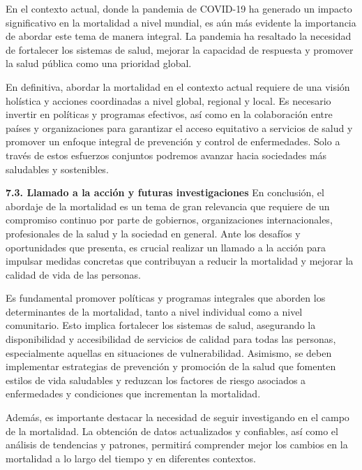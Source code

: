 \documentclass[8pt,a4paper]{beamer}
\begin{document}
{\begin{frame}{}
\begin{block}{}
En el contexto actual, donde la pandemia de COVID-19 ha generado un impacto significativo en la mortalidad a nivel mundial, es aún más evidente la importancia de abordar este tema de manera integral. La pandemia ha resaltado la necesidad de fortalecer los sistemas de salud, mejorar la capacidad de respuesta y promover la salud pública como una prioridad global.

En definitiva, abordar la mortalidad en el contexto actual requiere de una visión holística y acciones coordinadas a nivel global, regional y local. Es necesario invertir en políticas y programas efectivos, así como en la colaboración entre países y organizaciones para garantizar el acceso equitativo a servicios de salud y promover un enfoque integral de prevención y control de enfermedades. Solo a través de estos esfuerzos conjuntos podremos avanzar hacia sociedades más saludables y sostenibles.
\end{block}
\end{frame}

\begin{frame}{}
\begin{block}{\textbf{7.3. Llamado a la acción y futuras investigaciones}}
\setlength{\parskip}{3px}
\justifying
En conclusión, el abordaje de la mortalidad es un tema de gran relevancia que requiere de un compromiso continuo por parte de gobiernos, organizaciones internacionales, profesionales de la salud y la sociedad en general. Ante los desafíos y oportunidades que presenta, es crucial realizar un llamado a la acción para impulsar medidas concretas que contribuyan a reducir la mortalidad y mejorar la calidad de vida de las personas.

Es fundamental promover políticas y programas integrales que aborden los determinantes de la mortalidad, tanto a nivel individual como a nivel comunitario. Esto implica fortalecer los sistemas de salud, asegurando la disponibilidad y accesibilidad de servicios de calidad para todas las personas, especialmente aquellas en situaciones de vulnerabilidad. Asimismo, se deben implementar estrategias de prevención y promoción de la salud que fomenten estilos de vida saludables y reduzcan los factores de riesgo asociados a enfermedades y condiciones que incrementan la mortalidad.

Además, es importante destacar la necesidad de seguir investigando en el campo de la mortalidad. La obtención de datos actualizados y confiables, así como el análisis de tendencias y patrones, permitirá comprender mejor los cambios en la mortalidad a lo largo del tiempo y en diferentes contextos. 


\end{block}
\end{frame}}
\end{document}
